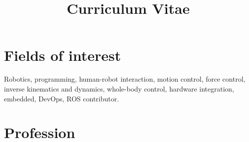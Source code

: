 \documentclass[12pt,a4paper,sans]{moderncv} %
\title{Curriculum Vitae}
\begin{document}
\makecvtitle %




\section{Fields of interest}
Robotics, programming, human-robot interaction, motion control, force control, inverse kinematics and dynamics, whole-body control, hardware integration, embedded, DevOps, ROS contributor.

\section{Profession}
\end{document}
